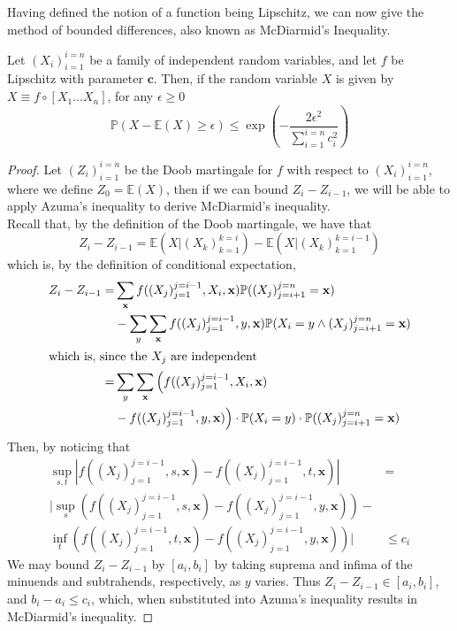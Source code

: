 	Having defined the notion of a function being Lipschitz, we can now give the method of 
	bounded differences, also known as McDiarmid's Inequality.
	\begin{theorem}
		Let $(X_i)_{i=1}^{i=n}$ be a family of independent random variables, and let 
		$f$ be Lipschitz with parameter $\mathbf{c}$. Then, if the random variable $X$
		is given by $X \equiv f \circ [X_1\hdots X_n]$, for any $\epsilon \geq 0$
		$$
			\mathbb{P}(X - \mathbb{E}(X) \geq \epsilon) \leq 
			\exp\left(-\frac{2\epsilon^2}{\sum_{i=1}^{i=n} c_i^2}\right)
		$$
	\end{theorem}
	\begin{proof}
		Let $(Z_i)_{i=1}^{i=n}$ be the Doob martingale for $f$ with respect to 
		$(X_i)_{i=1}^{i=n}$, where we define $Z_0 = \mathbb{E}(X)$, then if we can bound 
		$Z_{i} - Z_{i-1}$, we will be able to apply Azuma's inequality to derive McDiarmid's 
		inequality. \\
		Recall that, by the definition of the Doob martingale, we have that
		$$
			Z_{i}-Z_{i-1} = \mathbb{E}(X | (X_k)_{k=1}^{k=i})- 
			\mathbb{E}(X | (X_k)_{k=1}^{k=i-1})
		$$
		which is, by the definition of conditional expectation,
		\begin{align*}
			Z_{i}-Z_{i-1} =& 
			\sum_{\mathbf{x}} f((X_j)_{j=1}^{j=i-1}, X_i, \mathbf{x}) 
			\mathbb{P}((X_j)_{j=i+1}^{j=n} = \mathbf{x}) \\ &- 
			\sum_{y} \sum_{\mathbf{x}} f((X_j)_{j=1}^{j=i-1}, y, \mathbf{x}) 
			\mathbb{P}(X_i = y \land (X_j)_{j=i+1}^{j=n} = \mathbf{x}) \\
			\intertext{which is, since the $X_j$ are independent}
			=& \sum_{y}\sum_{\mathbf{x}} \Big(f((X_j)_{j=1}^{j=i-1},X_i,\mathbf{x})\\
			&- f((X_j)_{j=1}^{j=i-1}, y, \mathbf{x}) \Big) \cdot 
			\mathbb{P}(X_i=y) \cdot \mathbb{P}((X_j)_{j=i+1}^{j=n} = \mathbf{x})
		\end{align*}
		Then, by noticing that 
		\begin{align*}
			\sup_{s,t}\left|f((X_j)_{j=1}^{j=i-1}, s, \mathbf{x})
			-f((X_j)_{j=1}^{j=i-1}, t, \mathbf{x})\right| &= \\
			\Big|\sup_{s}\left(f((X_j)_{j=1}^{j=i-1}, s, \mathbf{x})-
			f((X_j)_{j=1}^{j=i-1}, y, \mathbf{x})\right) -& \\
			\inf_{t}\left(f((X_j)_{j=1}^{j=i-1}, t, \mathbf{x})-
			f((X_j)_{j=1}^{j=i-1}, y, \mathbf{x})\right)\Big|  &\leq c_i
		\end{align*}
		We may bound $Z_i - Z_{i-1}$ by $[a_i, b_i]$ by taking suprema and infima of the 
		minuends and subtrahends, respectively, as $y$ varies. Thus $Z_i - Z_{i-1} \in 
		[a_i, b_i]$, and $b_i-a_i\leq c_i$, which, when substituted into Azuma's inequality
		results in McDiarmid's inequality.
	\end{proof}

